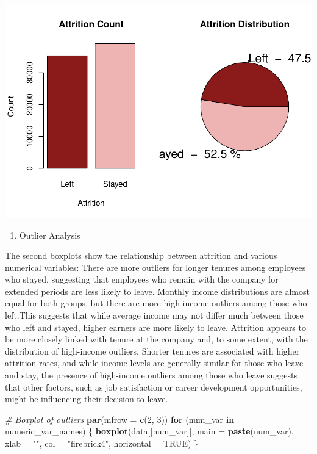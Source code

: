 \documentclass[
  10pt,
  paper=a4,
  ,captions=tableheading
]{scrartcl}
\newenvironment{Shaded}{\begin{snugshade}}{\end{snugshade}}
\newcommand{\AttributeTok}[1]{\textcolor[rgb]{0.13,0.29,0.53}{#1}}
\newcommand{\CommentTok}[1]{\textcolor[rgb]{0.56,0.35,0.01}{\textit{#1}}}
\newcommand{\ConstantTok}[1]{\textcolor[rgb]{0.56,0.35,0.01}{#1}}
\newcommand{\ControlFlowTok}[1]{\textcolor[rgb]{0.13,0.29,0.53}{\textbf{#1}}}
\newcommand{\DecValTok}[1]{\textcolor[rgb]{0.00,0.00,0.81}{#1}}
\newcommand{\FunctionTok}[1]{\textcolor[rgb]{0.13,0.29,0.53}{\textbf{#1}}}
\newcommand{\NormalTok}[1]{#1}
\newcommand{\StringTok}[1]{\textcolor[rgb]{0.31,0.60,0.02}{#1}}
\providecommand{\tightlist}{%
  \setlength{\itemsep}{0pt}\setlength{\parskip}{0pt}}
\begin{document}
\includegraphics[width=0.65\linewidth]{figs/data_targetdist-1}

\small

\begin{enumerate}
\def\labelenumi{\arabic{enumi}.}
\setcounter{enumi}{6}
\tightlist
\item
  Outlier Analysis
\end{enumerate}

The second boxplots show the relationship between attrition and various
numerical variables: There are more outliers for longer tenures among
employees who stayed, suggesting that employees who remain with the
company for extended periods are less likely to leave. Monthly income
distributions are almost equal for both groups, but there are more
high-income outliers among those who left.This suggests that while
average income may not differ much between those who left and stayed,
higher earners are more likely to leave. Attrition appears to be more
closely linked with tenure at the company and, to some extent, with the
distribution of high-income outliers. Shorter tenures are associated
with higher attrition rates, and while income levels are generally
similar for those who leave and stay, the presence of high-income
outliers among those who leave suggests that other factors, such as job
satisfaction or career development opportunities, might be influencing
their decision to leave.

\small

\begin{Shaded}
\begin{Highlighting}[]
\CommentTok{\# Boxplot of outliers}
\FunctionTok{par}\NormalTok{(}\AttributeTok{mfrow =} \FunctionTok{c}\NormalTok{(}\DecValTok{2}\NormalTok{, }\DecValTok{3}\NormalTok{))}
\ControlFlowTok{for}\NormalTok{ (num\_var }\ControlFlowTok{in}\NormalTok{ numeric\_var\_names) \{}
    \FunctionTok{boxplot}\NormalTok{(data[[num\_var]], }\AttributeTok{main =} \FunctionTok{paste}\NormalTok{(num\_var), }\AttributeTok{xlab =} \StringTok{""}\NormalTok{, }\AttributeTok{col =} \StringTok{"firebrick4"}\NormalTok{,}
        \AttributeTok{horizontal =} \ConstantTok{TRUE}\NormalTok{)}
\NormalTok{\}}
\end{Highlighting}
\end{Shaded}
\end{document}
